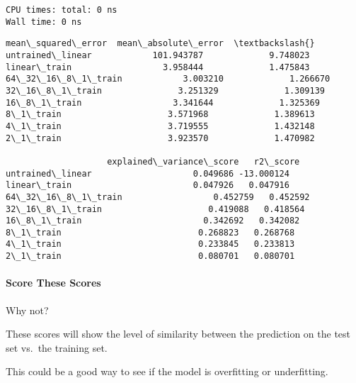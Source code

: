 \documentclass[11pt]{article}
\makeatletter
\newcommand{\boxspacing}{\kern\kvtcb@left@rule\kern\kvtcb@boxsep}
\newcommand{\prompt}[4]{
        {\ttfamily\llap{{\color{#2}[#3]:\hspace{3pt}#4}}\vspace{-\baselineskip}}
    }
\makeatother
\begin{document}
    \begin{Verbatim}[commandchars=\\\{\}]
CPU times: total: 0 ns
Wall time: 0 ns
    \end{Verbatim}

            \begin{tcolorbox}[breakable, size=fbox, boxrule=.5pt, pad at break*=1mm, opacityfill=0]
\prompt{Out}{outcolor}{48}{\boxspacing}
\begin{Verbatim}[commandchars=\\\{\}]
                    mean\_squared\_error  mean\_absolute\_error  \textbackslash{}
untrained\_linear            101.943787             9.748023
linear\_train                  3.958444             1.475843
64\_32\_16\_8\_1\_train            3.003210             1.266670
32\_16\_8\_1\_train               3.251329             1.309139
16\_8\_1\_train                  3.341644             1.325369
8\_1\_train                     3.571968             1.389613
4\_1\_train                     3.719555             1.432148
2\_1\_train                     3.923570             1.470982

                    explained\_variance\_score   r2\_score
untrained\_linear                    0.049686 -13.000124
linear\_train                        0.047926   0.047916
64\_32\_16\_8\_1\_train                  0.452759   0.452592
32\_16\_8\_1\_train                     0.419088   0.418564
16\_8\_1\_train                        0.342692   0.342082
8\_1\_train                           0.268823   0.268768
4\_1\_train                           0.233845   0.233813
2\_1\_train                           0.080701   0.080701
\end{Verbatim}
\end{tcolorbox}
        
    \paragraph{Score These Scores}\label{score-these-scores}

Why not?

These scores will show the level of similarity between the prediction on
the test set vs.~the training set.

This could be a good way to see if the model is overfitting or
underfitting.
\end{document}
